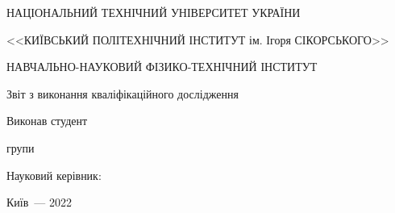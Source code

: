 \thispagestyle{empty}

\begin{center}
НАЦІОНАЛЬНИЙ ТЕХНІЧНИЙ УНІВЕРСИТЕТ УКРАЇНИ \par
<<КИЇВСЬКИЙ ПОЛІТЕХНІЧНИЙ ІНСТИТУТ ім. Ігоря СІКОРСЬКОГО>>\par
НАВЧАЛЬНО-НАУКОВИЙ ФІЗИКО-ТЕХНІЧНИЙ ІНСТИТУТ\par

\vspace{40mm}
{\huge Звіт з виконання кваліфікаційного дослідження \par}

\huge\MakeUppercase{\textbf{\reportTitle}} \par
\end{center}

\vspace{40mm}
\begin{flushright}
Виконав студент

групи \reportAuthorGroup

\reportAuthor

\vspace{20mm}
Науковий керівник:

\supervisorRegalia

\supervisorFio

\end{flushright}

\vspace{20mm}
\begin{center}
{Київ~--- 2022}
\end{center}

\newpage
\thispagestyle{plain}
